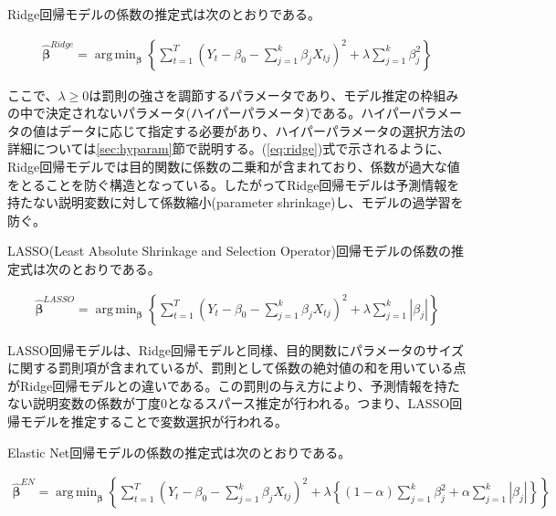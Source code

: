\documentclass[a4paper, 12pt]{jsarticle}
\DeclareMathOperator*{\argmin}{arg\,min}
\begin{document}
Ridge回帰モデルの係数の推定式は次のとおりである。

\begin{equation} \label{eq:ridge}
  \begin{split}
    \hat{\bm{\beta}}^{Ridge} = \argmin_{\bm{\beta}}\left\{ \sum_{t=1}^{T} \left( Y_t - \beta_0 - \sum_{j=1}^{k} \beta_{j} X_{tj} \right)^2 + \lambda \sum_{j=1}^{k} \beta_{j}^{2} \right\}
  \end{split}
\end{equation}

ここで、$\lambda \geq 0$は罰則の強さを調節するパラメータであり、モデル推定の枠組みの中で決定されないパラメータ(ハイパーパラメータ)である。ハイパーパラメータの値はデータに応じて指定する必要があり、ハイパーパラメータの選択方法の詳細については\ref{sec:hyparam}節で説明する。(\ref{eq:ridge})式で示されるように、Ridge回帰モデルでは目的関数に係数の二乗和が含まれており、係数が過大な値をとることを防ぐ構造となっている。したがってRidge回帰モデルは予測情報を持たない説明変数に対して係数縮小(parameter shrinkage)し、モデルの過学習を防ぐ。

LASSO(Least Absolute Shrinkage and Selection Operator)回帰モデルの係数の推定式は次のとおりである。

\begin{equation} \label{eq:lasso}
  \begin{split}
    \hat{\bm{\beta}}^{LASSO} = \argmin_{\bm{\beta}}\left\{ \sum_{t=1}^{T} \left( Y_t - \beta_0 - \sum_{j=1}^{k} \beta_{j} X_{tj} \right)^2 + \lambda \sum_{j=1}^{k} \left|\beta_{j}\right| \right\}
  \end{split}
\end{equation}

LASSO回帰モデルは、Ridge回帰モデルと同様、目的関数にパラメータのサイズに関する罰則項が含まれているが、罰則として係数の絶対値の和を用いている点がRidge回帰モデルとの違いである。この罰則の与え方により、予測情報を持たない説明変数の係数が丁度0となるスパース推定が行われる。つまり、LASSO回帰モデルを推定することで変数選択が行われる。

Elastic Net回帰モデルの係数の推定式は次のとおりである。

\begin{equation}
  \begin{split}
    \hat{\bm{\beta}}^{EN} = \argmin_{\bm{\beta}}\left\{ \sum_{t=1}^{T} \left( Y_t - \beta_0 - \sum_{j=1}^{k} \beta_{j} X_{tj} \right)^2 + 
    \lambda \left\{ 
      \left( 1 - \alpha \right) \sum_{j=1}^{k} \beta_{j}^2 + 
      \alpha \sum_{j=1}^{k} \left|\beta_{j}\right| 
      \right\} 
    \right\}
  \end{split}
\end{equation}
\end{document}
